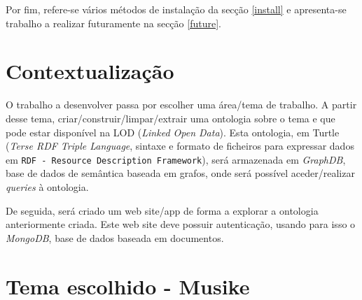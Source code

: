 \documentclass{article}
\begin{document}
Por fim, refere-se vários métodos de instalação da secção \ref{install} e apresenta-se trabalho a realizar futuramente na secção \ref{future}.

\tableofcontents

\section{Contextualização} \label{context}

O trabalho a desenvolver passa por escolher uma área/tema de trabalho. A partir desse tema, criar/construir/limpar/extrair uma ontologia sobre o tema e que pode estar disponível na LOD (\textit{Linked Open Data}). Esta ontologia, em Turtle (\textit{Terse RDF Triple Language}, sintaxe e formato de ficheiros para expressar dados em \texttt{RDF - Resource Description Framework}), será armazenada em \textit{GraphDB}, base de dados de semântica baseada em grafos, onde será possível aceder/realizar \textit{queries} à ontologia.

De seguida, será criado um web site/app de forma a explorar a ontologia anteriormente criada. Este web site deve possuir autenticação, usando para isso o \textit{MongoDB}, base de dados baseada em documentos.

\section{Tema escolhido - \textbf{Musike}} \label{tema}
\end{document}
